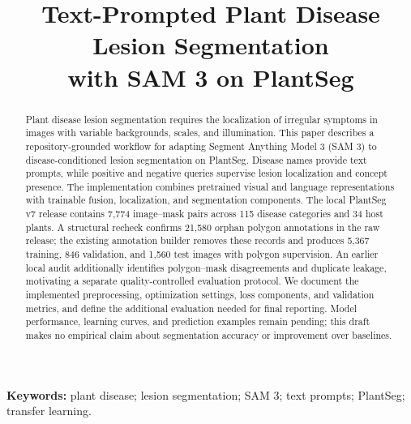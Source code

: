 \documentclass[10pt,a4paper,twocolumn]{article}
\title{Text-Prompted Plant Disease Lesion Segmentation\\with SAM 3 on PlantSeg}
\author{}
\date{}
\begin{document}
\maketitle
\begin{abstract}
Plant disease lesion segmentation requires the localization of irregular symptoms in images with variable backgrounds, scales, and illumination. This paper describes a repository-grounded workflow for adapting Segment Anything Model 3 (SAM 3) to disease-conditioned lesion segmentation on PlantSeg. Disease names provide text prompts, while positive and negative queries supervise lesion localization and concept presence. The implementation combines pretrained visual and language representations with trainable fusion, localization, and segmentation components. The local PlantSeg v7 release contains 7,774 image--mask pairs across 115 disease categories and 34 host plants. A structural recheck confirms 21,580 orphan polygon annotations in the raw release; the existing annotation builder removes these records and produces 5,367 training, 846 validation, and 1,560 test images with polygon supervision. An earlier local audit additionally identifies polygon--mask disagreements and duplicate leakage, motivating a separate quality-controlled evaluation protocol. We document the implemented preprocessing, optimization settings, loss components, and validation metrics, and define the additional evaluation needed for final reporting. Model performance, learning curves, and prediction examples remain pending; this draft makes no empirical claim about segmentation accuracy or improvement over baselines.
\end{abstract}
\noindent\textbf{Keywords:} plant disease; lesion segmentation; SAM 3; text prompts; PlantSeg; transfer learning.







\balance


\end{document}
